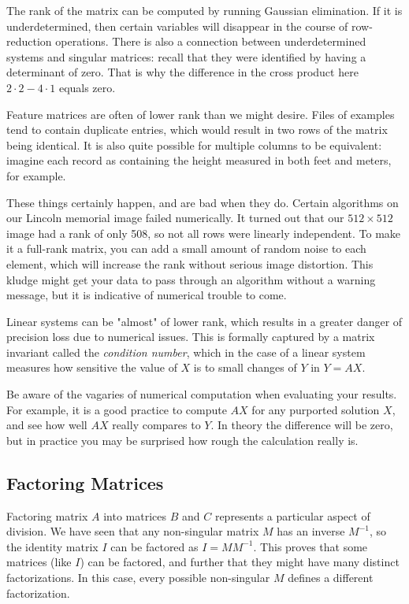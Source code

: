 \documentclass[10pt]{article}
\begin{document}
The rank of the matrix can be computed by running Gaussian elimination. If it is underdetermined, then certain variables will disappear in the course of row-reduction operations. There is also a connection between underdetermined systems and singular matrices: recall that they were identified by having a determinant of zero. That is why the difference in the cross product here \(2 \cdot 2 - 4 \cdot 1\) equals zero.

Feature matrices are often of lower rank than we might desire. Files of examples tend to contain duplicate entries, which would result in two rows of the matrix being identical. It is also quite possible for multiple columns to be equivalent: imagine each record as containing the height measured in both feet and meters, for example.

These things certainly happen, and are bad when they do. Certain algorithms on our Lincoln memorial image failed numerically. It turned out that our \(512 \times 512\) image had a rank of only 508, so not all rows were linearly independent. To make it a full-rank matrix, you can add a small amount of random noise to each element, which will increase the rank without serious image distortion. This kludge might get your data to pass through an algorithm without a warning message, but it is indicative of numerical trouble to come.

Linear systems can be "almost" of lower rank, which results in a greater danger of precision loss due to numerical issues. This is formally captured by a matrix invariant called the \textit{condition number}, which in the case of a linear system measures how sensitive the value of \(X\) is to small changes of \(Y\) in \(Y=AX\).

Be aware of the vagaries of numerical computation when evaluating your results. For example, it is a good practice to compute \(AX\) for any purported solution \(X\), and see how well \(AX\) really compares to \(Y\). In theory the difference will be zero, but in practice you may be surprised how rough the calculation really is.

\subsection*{Factoring Matrices}
Factoring matrix \(A\) into matrices \(B\) and \(C\) represents a particular aspect of division. We have seen that any non-singular matrix \(M\) has an inverse \(M^{-1}\), so the identity matrix \(I\) can be factored as \(I=MM^{-1}\). This proves that some matrices (like \(I\)) can be factored, and further that they might have many distinct factorizations. In this case, every possible non-singular \(M\) defines a different factorization.
\end{document}
